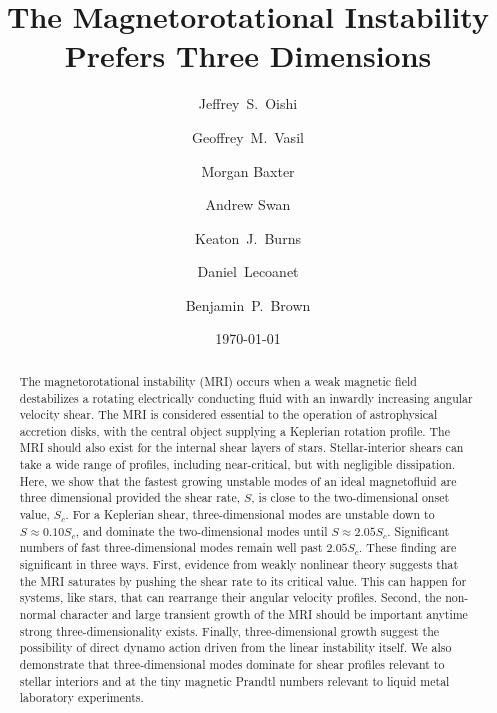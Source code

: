 \documentclass[aps,prl,reprint,superscriptaddress]{revtex4-1}
\begin{document}
\title{The Magnetorotational Instability Prefers Three Dimensions}

\author{Jeffrey~S.~Oishi}

\author{Geoffrey~M.~Vasil}
\author{Morgan Baxter}
\author{Andrew Swan}
\author{Keaton~J.~Burns}
\author{Daniel~Lecoanet}
\author{Benjamin~P.~Brown}

\date{\today}

\begin{abstract}
The magnetorotational instability (MRI) occurs when a weak magnetic field destabilizes a rotating electrically conducting fluid with an inwardly increasing angular velocity shear.
The MRI is considered essential to the operation of astrophysical accretion disks, with the central object supplying a Keplerian rotation profile.
The MRI should also exist for the internal shear layers of stars.
Stellar-interior shears can take a wide range of profiles, including near-critical, but with negligible dissipation. 
Here, we show that the fastest growing unstable modes of an ideal magnetofluid are three dimensional provided the shear rate, $S$, is close to the two-dimensional onset value, $S_c$.
For a Keplerian shear, three-dimensional modes are unstable down to $S \approx 0.10 S_c$, and dominate the two-dimensional modes until $S \approx 2.05 S_c$.
Significant numbers of fast three-dimensional modes remain well past $2.05 S_{c}$. 
These finding are significant in three ways. 
First, evidence from weakly nonlinear theory suggests that the MRI saturates by pushing the shear rate to its critical value. 
This can happen for systems, like stars, that can rearrange their angular velocity profiles.
Second, the non-normal character and large transient growth of the MRI should be important anytime strong three-dimensionality exists.
Finally, three-dimensional growth suggest the possibility of direct dynamo action driven from the linear instability itself.
We also demonstrate that three-dimensional modes dominate for shear profiles relevant to stellar interiors and at the tiny magnetic Prandtl numbers relevant to liquid metal laboratory experiments.
\end{abstract}
\end{document}
